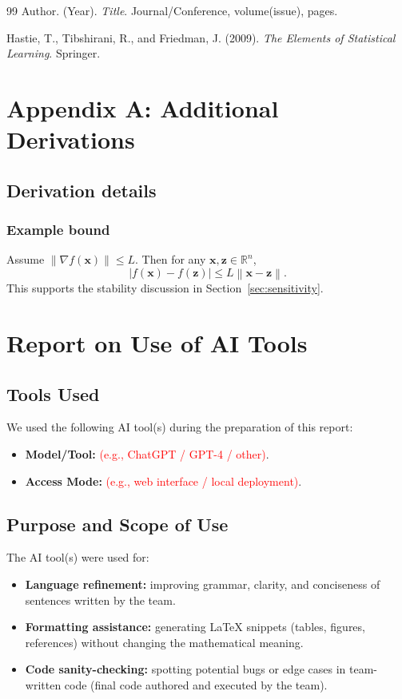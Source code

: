 \documentclass[12pt]{article}
\newcommand{\R}{\mathbb{R}}
\newcommand{\vect}[1]{\boldsymbol{#1}}
\newcommand{\norm}[1]{\left\lVert #1 \right\rVert}
\begin{document}
\clearpage

\begin{thebibliography}{99}
Author. (Year). \textit{Title}. Journal/Conference, volume(issue), pages.

Hastie, T., Tibshirani, R., and Friedman, J. (2009).
\textit{The Elements of Statistical Learning}. Springer.
\end{thebibliography}

\appendix
\section{Appendix A: Additional Derivations}
\subsection{Derivation details}
\subsubsection{Example bound}
Assume $\norm{\nabla f(\vect{x})}\le L$. Then for any $\vect{x},\vect{z}\in\R^n$,
\[
|f(\vect{x})-f(\vect{z})|\le L\norm{\vect{x}-\vect{z}}.
\]
This supports the stability discussion in Section~\ref{sec:sensitivity}.
\clearpage
\section*{Report on Use of AI Tools}

\subsection*{Tools Used}
We used the following AI tool(s) during the preparation of this report:
\begin{itemize}
  \item \textbf{Model/Tool:} \textcolor{red}{(e.g., ChatGPT / GPT-4 / other)}.
  \item \textbf{Access Mode:} \textcolor{red}{(e.g., web interface / local deployment)}.
\end{itemize}

\subsection*{Purpose and Scope of Use}
The AI tool(s) were used for:
\begin{itemize}
  \item \textbf{Language refinement:} improving grammar, clarity, and conciseness of sentences written by the team.
  \item \textbf{Formatting assistance:} generating LaTeX snippets (tables, figures, references) without changing the mathematical meaning.
  \item \textbf{Code sanity-checking:} spotting potential bugs or edge cases in team-written code (final code authored and executed by the team).
\end{itemize}
\end{document}
